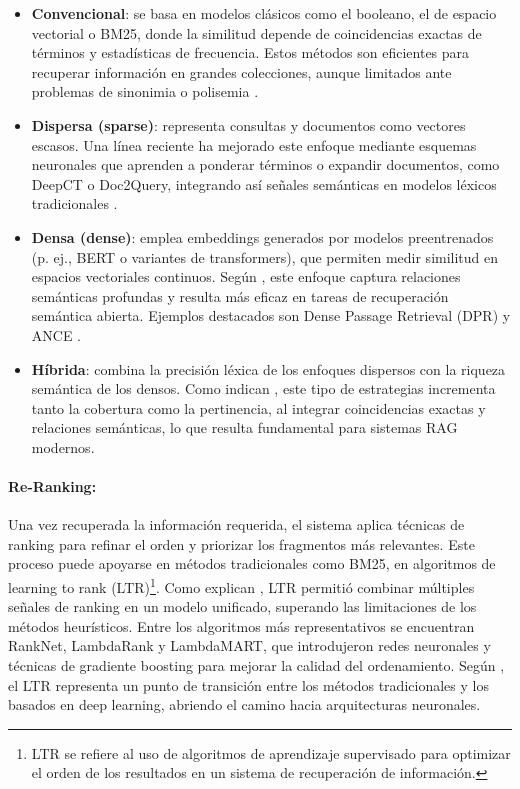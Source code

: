\begin{itemize}
    \item \textbf{Convencional}: se basa en modelos clásicos como el booleano, el de espacio vectorial o BM25, donde la similitud depende de coincidencias exactas de términos y estadísticas de frecuencia. Estos métodos son eficientes para recuperar información en grandes colecciones, aunque limitados ante problemas de sinonimia o polisemia \parencite{hambarde2023ir}.
    
    \item \textbf{Dispersa (sparse)}: representa consultas y documentos como vectores escasos. Una línea reciente ha mejorado este enfoque mediante esquemas neuronales que aprenden a ponderar términos o expandir documentos, como DeepCT o Doc2Query, integrando así señales semánticas en modelos léxicos tradicionales \parencite{hambarde2023ir,gao2023rag}. 
    
    \item \textbf{Densa (dense)}: emplea embeddings generados por modelos preentrenados (p. ej., BERT o variantes de transformers), que permiten medir similitud en espacios vectoriales continuos. Según \textcite{hu2024ragrau}, este enfoque captura relaciones semánticas profundas y resulta más eficaz en tareas de recuperación semántica abierta. Ejemplos destacados son Dense Passage Retrieval (DPR) y ANCE \parencite{hambarde2023ir}. 
    
    \item \textbf{Híbrida}: combina la precisión léxica de los enfoques dispersos con la riqueza semántica de los densos. Como indican \textcite{zhai2024llmIR}, este tipo de estrategias incrementa tanto la cobertura como la pertinencia, al integrar coincidencias exactas y relaciones semánticas, lo que resulta fundamental para sistemas RAG modernos.
\end{itemize}

\paragraph{Re-Ranking:} Una vez recuperada la información requerida, el sistema aplica técnicas de ranking para refinar el orden y priorizar los fragmentos más relevantes.
Este proceso puede apoyarse en métodos tradicionales como BM25, en algoritmos de learning to rank (LTR)\footnote{ LTR se refiere al uso de algoritmos de aprendizaje supervisado para optimizar el orden de los resultados en un sistema de recuperación de información.}.
Como explican \textcite{bernard2025fate}, LTR permitió combinar múltiples señales de ranking en un modelo unificado, superando las limitaciones de los métodos
heurísticos. Entre los algoritmos más representativos se encuentran RankNet, LambdaRank y LambdaMART, que introdujeron redes neuronales y técnicas de gradiente 
boosting para mejorar la calidad del ordenamiento. Según \textcite{hambarde2023ir}, el LTR representa un punto de transición entre los métodos tradicionales y los basados en 
deep learning, abriendo el camino hacia arquitecturas neuronales.

